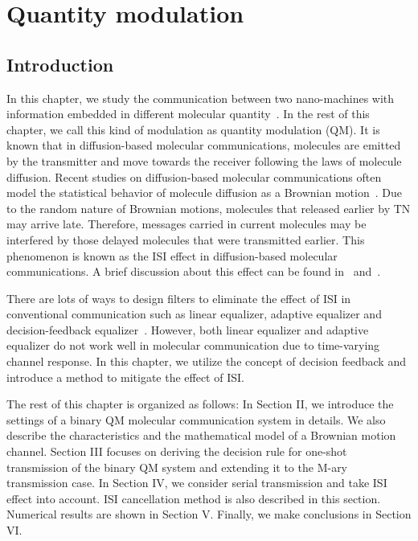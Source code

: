 \newcommand{\decision}{\operatornamewithlimits{\gtrless}}
\newcommand{\argmax}{\operatornamewithlimits{argmax}}
\newcommand{\argmin}{\operatornamewithlimits{argmin}}

\chapter{Quantity modulation}
\label{c:qm}

\section{Introduction}
 In this chapter, we study the communication between two nano-machines with information embedded in different molecular quantity~\cite{Andrew1}. In the rest of this chapter, we call this kind of modulation as quantity modulation (QM). It is known that in diffusion-based molecular communications, molecules are emitted by the transmitter and move towards the receiver following the laws of molecule diffusion. Recent studies on diffusion-based molecular communications often model the statistical behavior of molecule diffusion as a Brownian motion~\cite{brown}. Due to the random nature of Brownian motions, molecules that released earlier by TN may arrive late. Therefore, messages carried in current molecules may be interfered by those delayed molecules that were transmitted earlier. 
This phenomenon is known as the ISI effect in diffusion-based molecular communications. A brief discussion about this effect can be found in~\cite{ISI_concen} and~\cite{delaySelector}.

There are lots of ways to design filters to eliminate the effect of ISI in conventional communication such as linear equalizer, adaptive equalizer and decision-feedback equalizer~\cite{commSysEng}. However, both linear equalizer and adaptive equalizer do not work well in molecular communication due to time-varying channel response.
 In this chapter, we utilize the concept of decision feedback and introduce a method to mitigate the effect of ISI.

The rest of this chapter is organized as follows: In Section II, we introduce the settings of a binary QM molecular communication system in details. We also describe the characteristics and the mathematical model of a Brownian motion channel. Section III focuses on deriving the decision rule for one-shot transmission of the binary QM system and extending it to the M-ary transmission case. In Section IV, we consider serial transmission and take ISI effect into account. ISI cancellation method is also described in this section. Numerical results are shown in Section V. Finally, we make conclusions in Section VI.

